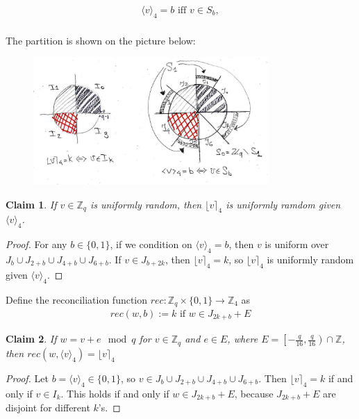 \documentclass[12pt]{article}
\newcommand{\Z}{\mathbb{Z}}
\newtheorem{claim}{Claim}
\begin{document}
\begin{align*}
\langle v \rangle_4 = b\text{ iff } v \in S_b,\\
\end{align*}

The partition is shown on the picture below:
\begin{figure}[H]
    \centering
    \includegraphics[width=0.8\textwidth]{2bits_pic.jpg}
\end{figure}

\begin{claim}
If $v \in \Z_q$ is uniformly random, then $\lfloor v \rceil_4$ is uniformly ramdom given $\langle v \rangle_4$.
\end{claim}
\begin{proof}
For any $b \in \{0, 1\}$, if we condition on $\langle v \rangle_4 = b$, then $v$ is uniform over $J_b \cup J_{2+b} \cup J_{4+b} \cup J_{6+b}$. If $v \in J_{b + 2k}$, then $\lfloor v \rceil_4 = k$, so $\lfloor v \rceil_4$ is uniformly random given $\langle v \rangle_4$.
\end{proof}

Define the reconciliation function $rec: \Z_q \times \{0, 1\} \rightarrow \Z_4$ as
\begin{align*}
rec(w, b):= k\text{ if } w \in J_{2k + b} + E
\end{align*}

\begin{claim}
If $w = v + e \mod q$ for $v \in \Z_q$ and $e \in E$, where $E = \left[-\frac{q}{16}, \frac{q}{16}\right) \cap \Z$, then $rec(w, \langle v \rangle_4) = \lfloor v \rceil_4$
\end{claim}
\begin{proof}
Let $b = \langle v \rangle_4 \in \{0, 1\}$, so $v \in J_b \cup J_{2+b} \cup J_{4+b} \cup J_{6+b}$. Then $\lfloor v \rceil_4 = k$ if and only if $v \in I_k$. This holds if and only if $w \in J_{2k + b} + E$, because $J_{2k + b} + E$ are disjoint for different $k$'s.
\end{proof}
\end{document}
